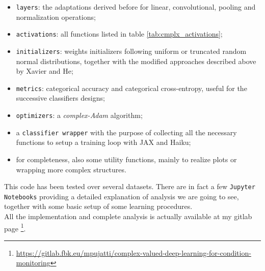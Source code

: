 \documentclass[../main.tex]{subfiles}
\begin{document}
\begin{itemize}
	\item \texttt{layers}: the adaptations derived before for linear, convolutional, pooling and normalization operations;
	\item \texttt{activations}: all functions listed in table \ref{tab:cmplx_activations};
	\item \texttt{initializers}: weights initializers following uniform or truncated random normal distributions, together with the modified approaches described above by Xavier and He;
	\item \texttt{metrics}: categorical accuracy and categorical cross-entropy, useful for the successive classifiers designs; 
	\item \texttt{optimizers}: a \textit{complex-Adam} algorithm;
	\item a \texttt{classifier wrapper} with the purpose of collecting all the necessary functions to setup a training loop with JAX and Haiku;
	\item for completeness, also some utility functions, mainly to realize plots or wrapping more complex structures. 
\end{itemize}
This code has been tested over several datasets. There are in fact a few \texttt{Jupyter Notebooks} providing a detailed explanation of analysis we are going to see, together with some basic setup of some learning procedures.\\
All the implementation and complete analysis is actually available at my gitlab page \footnote{\href{https://gitlab.fbk.eu/mpujatti/complex-valued-deep-learning-for-condition-monitoring}{https://gitlab.fbk.eu/mpujatti/complex-valued-deep-learning-for-condition-monitoring}}.
\end{document}
